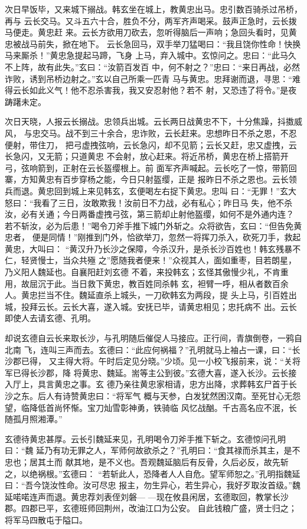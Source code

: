 次日早饭毕，又来城下搦战。韩玄坐在城上，教黄忠出马。忠引数百骑杀过吊桥，再与
云长交马。又斗五六十合，胜负不分，两军齐声喝采。鼓声正急时，云长拨马便走。黄忠赶
来。云长方欲用刀砍去，忽听得脑后一声响；急回头看时，见黄忠被战马前失，掀在地下。
云长急回马，双手举刀猛喝曰：“我且饶你性命！快换马来厮杀！”黄忠急提起马蹄，飞身
上马，弃入城中。玄惊问之。忠曰：“此马久不上阵，故有此失。”玄曰：“汝箭百发百
中，何不射之？”忠曰：“来日再战，必然诈败，诱到吊桥边射之。”玄以自己所乘一匹青
马与黄忠。忠拜谢而退，寻思：“难得云长如此义气！他不忍杀害我，我又安忍射他？若不
射，又恐违了将令。”是夜踌躇未定。

次日天晓，人报云长搦战。忠领兵出城。云长两日战黄忠不下，十分焦躁，抖擞威风，
与忠交马。战不到三十余合，忠诈败，云长赶来。忠想昨日不杀之恩，不忍便射，带住刀，
把弓虚拽弦响，云长急闪，却不见箭；云长又赶，忠又虚拽，云长急闪，又无箭；只道黄忠
不会射，放心赶来。将近吊桥，黄忠在桥上搭箭开弓，弦响箭到，正射在云长盔缨根上。前
面军齐声喊起。云长吃了一惊，带箭回寨，方知黄忠有百步穿杨之能，今日只射盔缨，正是
报昨日不杀之恩也。云长领兵而退。黄忠回到城上来见韩玄，玄便喝左右捉下黄忠。忠叫
曰：“无罪！”玄大怒曰：“我看了三日，汝敢欺我！汝前日不力战，必有私心；昨日马
失，他不杀汝，必有关通；今日两番虚拽弓弦，第三箭却止射他盔缨，如何不是外通内连？
若不斩汝，必为后患！”喝令刀斧手推下城门外斩之。众将欲告，玄曰：“但告免黄忠者，
便是同情！”刚推到门外，恰欲举刀，忽然一将挥刀杀入，砍死刀手，救起黄忠，大叫曰：
“黄汉升乃长沙之保障，今杀汉升，是杀长沙百姓也！韩玄残暴不仁，轻贤慢士，当众共殛
之”愿随我者便来！”众视其人，面如重枣，目若朗星，乃义阳人魏延也。自襄阳赶刘玄德
不着，来投韩玄；玄怪其傲慢少礼，不肯重用，故屈沉于此。当日救下黄忠，教百姓同杀韩
玄，袒臂一呼，相从者数百余人。黄忠拦当不住。魏延直杀上城头，一刀砍韩玄为两段，提
头上马，引百姓出城，投拜云长。云长大喜，遂入城。安抚已毕，请黄忠相见；忠托病不
出。云长即使人去请玄德、孔明。

却说玄德自云长来取长沙，与孔明随后催促人马接应。正行间，青旗倒卷，一鸦自北南
飞，连叫三声而去。玄德曰：“此应何祸福？”孔明就马上袖占一课，曰：“长沙郡已得，
又主得大将。午时后定见分晓。”少顷。见一小校飞报前来，说：“关将军已得长沙郡，降
将黄忠、魏延。耑等主公到彼。”玄德大喜，遂入长沙。云长接入厅上，具言黄忠之事。玄
德乃亲往黄忠家相请，忠方出降，求葬韩玄尸首于长沙之东。后人有诗赞黄忠曰：“将军气
概与天参，白发犹然困汉南。至死甘心无怨望，临降低首尚怀惭。宝刀灿雪彰神勇，铁骑临
风忆战酗。千古高名应不泯，长随孤月照湘潭。”

玄德待黄忠甚厚。云长引魏延来见，孔明喝令刀斧手推下斩之。玄德惊问孔明曰：“魏
延乃有功无罪之人，军师何故欲杀之？”孔明曰：“食其禄而杀其主，是不忠也；居其土而
献其地，是不义也。吾观魏延脑后有反骨，久后必反，故先斩之，以绝祸根。”玄德曰：
“若斩此人，恐降者人人自危。望军师恕之。”孔明指魏延曰：“吾今饶汝性命。汝可尽忠
报主，勿生异心，若生异心，我好歹取汝首级。”魏延喏喏连声而退。黄忠荐刘表侄刘磐—
—现在攸县闲居，玄德取回，教掌长沙郡。四郡已平，玄德班师回荆州，改油江口为公安。
自此钱粮广盛，贤士归之；将军马四散屯于隘口。

